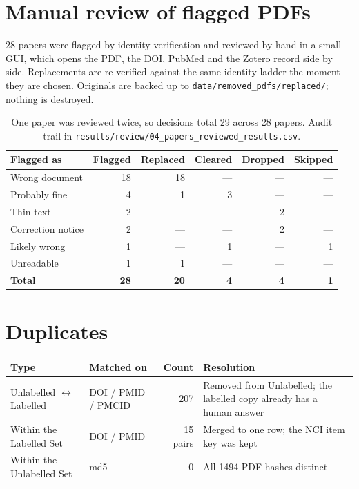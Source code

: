 \documentclass[11pt]{article}
\begin{document}
\section{Manual review of flagged PDFs}

28 papers were flagged by identity verification and reviewed by hand in a small GUI, which opens the
PDF, the DOI, PubMed and the Zotero record side by side. Replacements are re-verified against the
same identity ladder the moment they are chosen. Originals are backed up to
\texttt{data/removed\_pdfs/replaced/}; nothing is destroyed.

\begin{table}[h]
\centering
\begin{tabular}{lrrrrr}
\toprule
\textbf{Flagged as} & \textbf{Flagged} & \textbf{Replaced} & \textbf{Cleared} & \textbf{Dropped} & \textbf{Skipped} \\
\midrule
Wrong document       & 18 & 18 & --- & --- & --- \\
Probably fine        &  4 &  1 &  3 & --- & --- \\
Thin text            &  2 & --- & --- &  2 & --- \\
Correction notice    &  2 & --- & --- &  2 & --- \\
Likely wrong         &  1 & --- &  1 & --- &  1 \\
Unreadable           &  1 &  1 & --- & --- & --- \\
\midrule
\textbf{Total}       & \textbf{28} & \textbf{20} & \textbf{4} & \textbf{4} & \textbf{1} \\
\bottomrule
\end{tabular}
\caption{One paper was reviewed twice, so decisions total 29 across 28 papers. Audit trail in
\texttt{results/review/04\_papers\_reviewed\_results.csv}.}
\end{table}

\section{Duplicates}

\begin{table}[h]
\centering
\begin{tabular}{llrl}
\toprule
\textbf{Type} & \textbf{Matched on} & \textbf{Count} & \textbf{Resolution} \\
\midrule
Unlabelled $\leftrightarrow$ Labelled & DOI / PMID / PMCID & 207 & Removed from Unlabelled; the labelled copy already has a human answer \\
Within the Labelled Set & DOI / PMID & 15 pairs & Merged to one row; the NCI item key was kept \\
Within the Unlabelled Set & md5 & 0 & All 1494 PDF hashes distinct \\
\bottomrule
\end{tabular}
\end{table}
\end{document}
